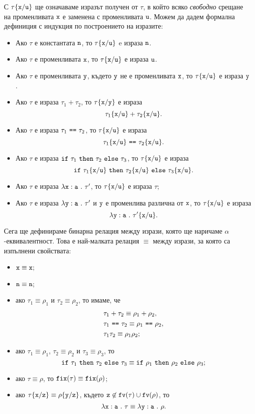 С $\tau\{\texttt{x}/\texttt{u}\}$ ще означаваме изразът получен от $\tau$, в който всяко \emph{свободно} срещане на променливата $\texttt{x}$
е заменена с променливата $\texttt{u}$. Можем да дадем формална дефиниция с индукция по построението на изразите:
\begin{itemize}
\item
  Ако $\tau$ е константата $\texttt{n}$, то $\tau\{\texttt{x}/\texttt{u}\}$ e израза $\texttt{n}$.
\item
  Ако $\tau$ е променливата $\texttt{x}$, то $\tau\{\texttt{x}/\texttt{u}\}$ е израза $\texttt{u}$.
\item
  Ако $\tau$ е променливата $\texttt{y}$, където $\texttt{y}$ не е променливата $\texttt{x}$, то $\tau\{\texttt{x}/\texttt{u}\}$ е израза $\texttt{y}$.
\item
  Ако $\tau$ е израза $\tau_1 + \tau_2$, то $\tau\{\texttt{x}/\texttt{y}\}$ е израза
  \[\tau_1\{\texttt{x}/\texttt{u}\} + \tau_2\{\texttt{x}/\texttt{u}\}.\]
\item
  Ако $\tau$ е израза $\tau_1\ \texttt{==}\ \tau_2$, то $\tau\{\texttt{x}/\texttt{u}\}$ е израза
  \[\tau_1\rename{x}{u}\ \vv{==}\ \tau_2\rename{x}{u}.\]
\item
  Ако $\tau$ е израза $\texttt{if}\ \tau_1\ \texttt{then}\ \tau_2\ \texttt{else}\ \tau_3$, то $\tau\{\texttt{x}/\texttt{u}\}$ е израза
  \[\texttt{if}\ \tau_1\{\texttt{x}/\texttt{u}\}\ \texttt{then}\ \tau_2\{\texttt{x}/\texttt{u}\}\ \texttt{else}\ \tau_3\{\texttt{x}/\texttt{u}\}.\]
\item
  Ако $\tau$ е израза $\lambda\texttt{x}:\texttt{a}\ .\ {\tau'}$, то
  $\tau\{\texttt{x}/\texttt{u}\}$ е израза $\tau$;
\item
  Ако $\tau$ е израза $\lambda\texttt{y}:\texttt{a}\ .\ {\tau'}$ и $\texttt{y}$ е променлива различна от $\texttt{x}$, то
  $\tau\{\texttt{x}/\texttt{u}\}$ е израза
  \[\lambda\texttt{y}:\texttt{a}\ .\ {\tau'\{\texttt{x}/\texttt{u}\}}.\]
\end{itemize}

Сега ще дефинираме бинарна релация между изрази, която ще наричаме $\alpha$-еквивалентност.
Това е най-малката релация $\equiv$ между изрази, за която са изпълнени свойствата:
\begin{itemize}
\item
  $\texttt{x} \equiv \texttt{x}$;
\item
  $\texttt{n} \equiv \texttt{n}$;
\item
  ако $\tau_1 \equiv \rho_1$ и $\tau_2 \equiv \rho_2$, то имаме, че
  \begin{align*}
    & \tau_1 + \tau_2 \equiv \rho_1 + \rho_2,\\
    & \tau_1\ \texttt{==}\ \tau_2 \equiv \rho_1\ \texttt{==}\ \rho_2,\\
    & \tau_1 \tau_2 \equiv \rho_1 \rho_2;
  \end{align*}
\item
  ако $\tau_1 \equiv \rho_1$, $\tau_2 \equiv \rho_2$ и $\tau_3 \equiv \rho_3$, то
  \[\texttt{if}\ \tau_1\ \texttt{then}\ \tau_2\ \texttt{else}\ \tau_3 \equiv \texttt{if}\ \rho_1\ \texttt{then}\ \rho_2\ \texttt{else}\ \rho_3;\]
\item
  ако $\tau \equiv \rho$, то $\texttt{fix}(\tau) \equiv \texttt{fix}(\rho)$;
\item
  ако $\tau\{\texttt{x}/\texttt{z}\} \equiv \rho\{\texttt{y}/\texttt{z}\}$, където $\texttt{z} \not\in \texttt{fv}(\tau) \cup \texttt{fv}(\rho)$, то
  \[\lambda\texttt{x}:\texttt{a}\ .\ {\tau} \equiv \lambda\texttt{y}:\texttt{a}\ .\ {\rho}.\]
\end{itemize}


